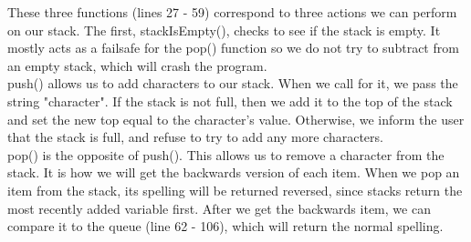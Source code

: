 \documentclass{article}
\begin{document}
These three functions (lines 27 - 59) correspond to three actions we can perform on our stack. The first, stackIsEmpty(), checks to see if the stack is empty. It mostly acts as a failsafe for the pop() function so we do not try to subtract from an empty stack, which will crash the program. 
\\ push() allows us to add characters to our stack. When we call for it, we pass the string "character". If the stack is not full, then we add it to the top of the stack and set the new top equal to the character's value. Otherwise, we inform the user that the stack is full, and refuse to try to add any more characters. 
\\ pop() is the opposite of push(). This allows us to remove a character from the stack. It is how we will get the backwards version of each item. When we pop an item from the stack, its spelling will be returned reversed, since stacks return the most recently added variable first. After we get the backwards item, we can compare it to the queue (line 62 - 106), which will return the normal spelling.
\end{document}

